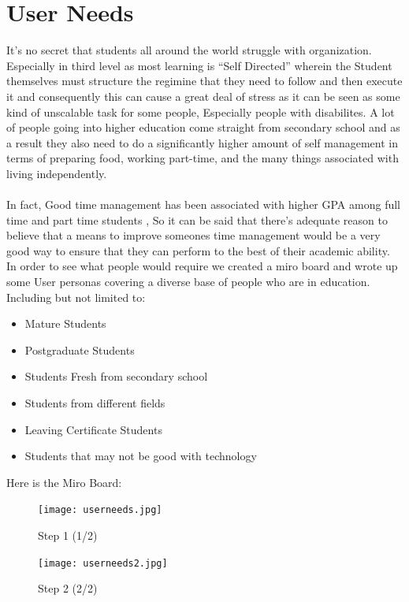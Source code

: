 \documentclass{article}
\begin{document}
	\section{User Needs}
	It's no secret that students all around the world struggle with organization. Especially in third level as most learning is ``Self Directed'' wherein the Student themselves must structure the regimine that they need to follow and then execute it and consequently this can cause a great deal of stress as it can be seen as some kind of unscalable task for some people, Especially people with disabilites. A lot of people going into higher education come straight from secondary school and as a result they also need to do a significantly higher amount of self management in terms of preparing food, working part-time, and the many things associated with living independently. \citep{aeonaguinis}\\ \\
	In fact, Good time management has been associated with higher GPA among full time and part time students \citep{maccanntime}, So it can be said that there's adequate reason to believe that a means to improve someones time management would be a very good way to ensure that they can perform to the best of their academic ability. In order to see what people would require we created a miro board and wrote up some User personas covering a diverse base of people who are in education. Including but not limited to:
		\begin{itemize}
			\item Mature Students
			\item Postgraduate Students
			\item Students Fresh from secondary school
			\item Students from different fields
			\item Leaving Certificate Students
			\item Students that may not be good with technology
		\end{itemize}\newpage
		Here is the Miro Board:
		\begin{figure}[h!]
			\begin{minipage}{0.5\linewidth}
				\centering
				\texttt{[image: userneeds.jpg]}
				\caption{Step 1 (1/2)}
			\end{minipage}%
			\begin{minipage}{0.5\linewidth}
				\centering
				\texttt{[image: userneeds2.jpg]}
				\caption{Step 2 (2/2)}
			\end{minipage}
		\end{figure}
\end{document}
